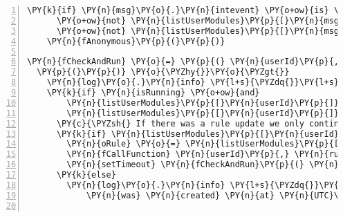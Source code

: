 \begin{Verbatim}[fontsize=\scriptsize,commandchars=\\\{\},numbers=left,firstnumber=1,stepnumber=1]
  \PY{k}{if} \PY{n}{msg}\PY{o}{.}\PY{n}{intevent} \PY{o+ow}{is} \PY{l+s}{\PYZsq{}}\PY{l+s}{new}\PY{l+s}{\PYZsq{}} \PY{o+ow}{or}
      \PY{o+ow}{not} \PY{n}{listUserModules}\PY{p}{[}\PY{n}{msg}\PY{o}{.}\PY{n}{user}\PY{p}{]} \PY{o+ow}{or} 
      \PY{o+ow}{not} \PY{n}{listUserModules}\PY{p}{[}\PY{n}{msg}\PY{o}{.}\PY{n}{user}\PY{p}{]}\PY{p}{[}\PY{n}{msg}\PY{o}{.}\PY{n}{rule}\PY{o}{.}\PY{n}{id}\PY{p}{]}
    \PY{n}{fAnonymous}\PY{p}{(}\PY{p}{)}

\PY{n}{fCheckAndRun} \PY{o}{=} \PY{p}{(} \PY{n}{userId}\PY{p}{,} \PY{n}{ruleId}\PY{p}{,} \PY{n}{timestamp} \PY{p}{)} \PY{o}{\PYZhy{}}\PY{o}{\PYZgt{}}
  \PY{p}{(}\PY{p}{)} \PY{o}{\PYZhy{}}\PY{o}{\PYZgt{}}
    \PY{n}{log}\PY{o}{.}\PY{n}{info} \PY{l+s}{\PYZdq{}}\PY{l+s}{EP | Check and run user \PYZsh{}\PYZob{} userId \PYZcb{}, rule \PYZsh{}\PYZob{} ruleId \PYZcb{}}\PY{l+s}{\PYZdq{}}
    \PY{k}{if} \PY{n}{isRunning} \PY{o+ow}{and} 
        \PY{n}{listUserModules}\PY{p}{[}\PY{n}{userId}\PY{p}{]} \PY{o+ow}{and} 
        \PY{n}{listUserModules}\PY{p}{[}\PY{n}{userId}\PY{p}{]}\PY{p}{[}\PY{n}{ruleId}\PY{p}{]}
      \PY{c}{\PYZsh{} If there was a rule update we only continue the latest setTimeout execution}
      \PY{k}{if} \PY{n}{listUserModules}\PY{p}{[}\PY{n}{userId}\PY{p}{]}\PY{p}{[}\PY{n}{ruleId}\PY{p}{]}\PY{o}{.}\PY{n}{timestamp} \PY{o+ow}{is} \PY{n}{timestamp} 
        \PY{n}{oRule} \PY{o}{=} \PY{n}{listUserModules}\PY{p}{[}\PY{n}{userId}\PY{p}{]}\PY{p}{[}\PY{n}{ruleId}\PY{p}{]}
        \PY{n}{fCallFunction} \PY{n}{userId}\PY{p}{,} \PY{n}{ruleId}\PY{p}{,} \PY{n}{oRule}
        \PY{n}{setTimeout} \PY{n}{fCheckAndRun}\PY{p}{(} \PY{n}{userId}\PY{p}{,} \PY{n}{ruleId}\PY{p}{,} \PY{n}{timestamp} \PY{p}{)}\PY{p}{,} \PY{n}{oRule}\PY{o}{.}\PY{n}{eventinterval}
      \PY{k}{else}
        \PY{n}{log}\PY{o}{.}\PY{n}{info} \PY{l+s}{\PYZdq{}}\PY{l+s}{EP | We found a newer polling interval and discontinue this one which}
            \PY{n}{was} \PY{n}{created} \PY{n}{at} \PY{n}{UTC}\PY{o}{|}\PY{c}{\PYZsh{}\PYZob{} timestamp \PYZcb{}\PYZdq{}}


\end{Verbatim}
